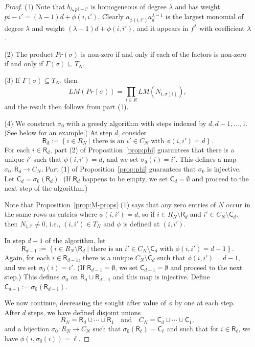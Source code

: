 \documentclass[10pt,a4paper]{amsart}
\newcommand{\Cs}{\mathsf{C}}
\newcommand{\Rs}{\mathsf{R}}
\renewcommand{\and}{\quad\text{and}\quad}
\begin{document}
\begin{proof}\mbox{}
  (1) Note that $b_{\lambda,pi-i'}$ is homogeneous of degree $\lambda$
  and has weight $pi-i'=(\lambda-1)d+\phi(i,i')$.  Clearly
  $a_{\phi(i,i')}a_d^{\lambda-1}$ is the largest monomial of degree
  $\lambda$ and weight $(\lambda-1)d+\phi(i,i')$, and it appears in
  $f^\lambda$ with coefficient $\lambda$.

  (2) The product $Pr(\sigma)$ is non-zero if and only if each of the factors is
  non-zero if and only if $\Gamma(\sigma)\subseteq T_N$.

  (3) If $\Gamma(\sigma)\subseteq T_N$, then
  \[ LM(Pr(\sigma))=\prod_{i\in R} LM(N_{i,\sigma(i)}),\]
  and the result then follows from part (1).

  (4) We construct $\sigma_0$ with a greedy algorithm with steps
  indexed by $d,d-1,\dots,1$.  (See below for an example.)  At step
  $d$, consider
\[\Rs_d:=\left\{i\in R_N\mid\text{there is an $i'\in C_N$ with
      $\phi(i,i')=d$}\right\}.\]
For each $i\in \Rs_d$, part (2) of Proposition~\ref{prop:phi}
guarantees that there is a unique $i'$ such that $\phi(i,i')=d$, and
we set $\sigma_0(i)=i'$. This defines a map $\sigma_0:\Rs_d\to C_N$.
Part (1) of Proposition~\ref{prop:phi} guarantees that $\sigma_0$ is
injective.  Let $\Cs_d=\sigma_0(\Rs_d)$.  (If $\Rs_d$ happens to be
empty, we set $\Cs_d=\emptyset$ and proceed to the next step of the
algorithm.)

Note that Proposition~\ref{prop:M-props} (1) says that any zero
entries of $N$ occur in the same rows as entries where $\phi(i,i')=d$,
so if $i\in R_N\setminus \Rs_d$ and $i'\in C_N\setminus \Cs_d$, then
$N_{i,i'}\neq0$, i.e., $(i,i')\in T_N$ and $\phi$ is defined at
$(i,i')$.

In step $d-1$ of the algorithm, let
\[\Rs_{d-1}:=\left\{i\in R_N\setminus \Rs_d\mid\text{there is an $i'\in
      C_N\setminus \Cs_d$ with $\phi(i,i')=d-1$}\right\}.\]
Again, for each $i\in \Rs_{d-1}$, there is a unique
$C_N\setminus \Cs_d$ such that $\phi(i,i')=d-1$, and we set
$\sigma_0(i)=i'$.  (If $\Rs_{d-1}=\emptyset$, we set
$\Cs_{d-1}=\emptyset$ and proceed to the next step.)  This defines
$\sigma_0$ on $\Rs_d\cup \Rs_{d-1}$ and this map is injective.  Define
$\Cs_{d-1}:=\sigma_0(\Rs_{d-1})$.

We now continue, decreasing the sought after value of $\phi$ by one at
each step.  After $d$ steps, we have defined disjoint unions
\[R_N=\Rs_d\cup\cdots\cup\Rs_1
  \and
  C_N=\Cs_d\cup\cdots\cup\Cs_1,\]
  and a bijection $\sigma_0:R_N\to C_N$ such that
  $\sigma_0(\Rs_\ell)=\Cs_\ell$ and such that for $i\in \Rs_\ell$, we
  have $\phi(i,\sigma_0(i))=\ell$.


\end{proof}
\end{document}
